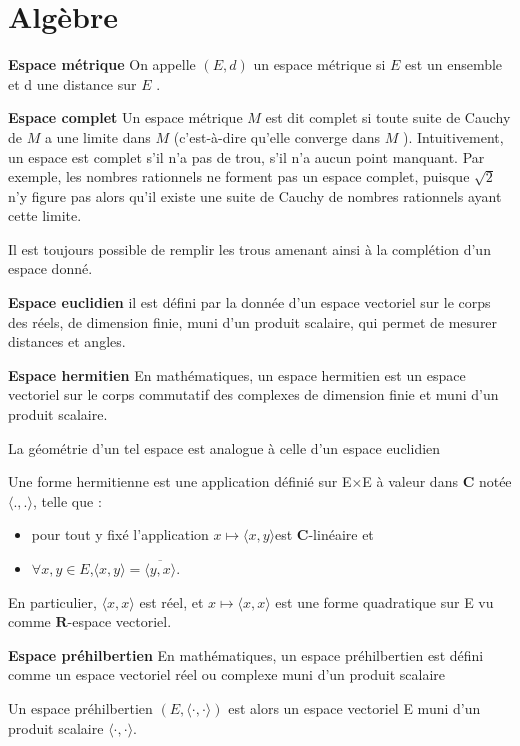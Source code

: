 \chapter{Alg\`ebre}
\textbf{Espace m\'etrique}
On appelle $(E, d)$ un espace m\'etrique si $ E$  est un ensemble et d une distance sur $E$ .

\textbf{Espace complet}
Un espace m\'etrique $ M$  est dit complet si toute suite de Cauchy de $ M$  a une limite dans $ M$  (c'est-\`a-dire qu'elle converge dans $M$ ).\newline
Intuitivement, un espace est complet s'il n'a pas de trou, s'il n'a aucun point manquant. \newline
Par exemple, les nombres rationnels ne forment pas un espace complet, puisque $\sqrt{2}$ n'y figure pas alors qu'il existe une suite de Cauchy de nombres rationnels ayant cette limite.

Il est toujours possible de remplir les trous amenant ainsi \`a la compl\'etion d'un espace donn\'e.

\textbf{Espace euclidien}
 il est d\'efini par la donn\'ee d'un espace vectoriel sur le corps des r\'eels, de dimension finie, muni d'un produit scalaire, qui permet de mesurer distances et angles.

\textbf{Espace hermitien}
En math\'ematiques, un espace hermitien est un espace vectoriel sur le corps commutatif des complexes de dimension finie et muni d'un produit scalaire.

La g\'eom\'etrie d'un tel espace est analogue \`a celle d'un espace euclidien

Une forme hermitienne est une application d\'efini\'e sur E×E \`a valeur dans $\mathbf{C}$ not\'ee $\langle .,.\rangle$, telle que :
\begin{itemize}
		\item pour tout y fix\'e l'application $x \mapsto \langle x,y\rangle $est $\mathbf{C}$-lin\'eaire et
		\item $\forall x,y \in E$,$\langle x,y\rangle=\overline{ \langle y,x\rangle}$.
\end{itemize}
En particulier, $\langle x,x\rangle$ est r\'eel, et $x\mapsto \langle x,x\rangle$ est une forme quadratique sur E vu comme $\mathbf{R}$-espace vectoriel.

\textbf{Espace pr\'ehilbertien}
En math\'ematiques, un espace pr\'ehilbertien est d\'efini comme un espace vectoriel r\'eel ou complexe muni d'un produit scalaire

Un espace pr\'ehilbertien $(E,\langle\cdot,\cdot\rangle)$ est alors un espace vectoriel E muni d'un produit scalaire $\langle\cdot,\cdot\rangle$.

